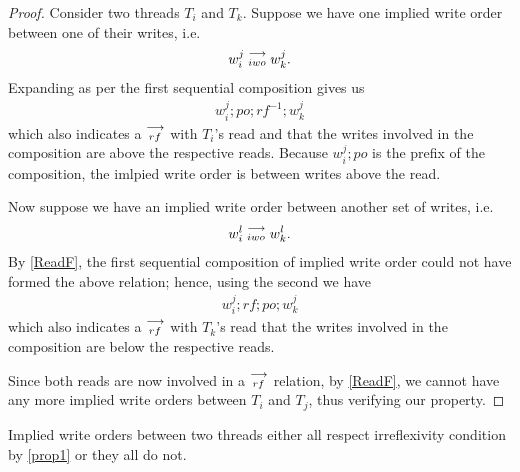     \begin{proof}
        Consider two threads $T_i$ and $T_k$. Suppose we have one implied write order between one of their writes, i.e. 
        \begin{align}
            w_i^j\stackrel{\longrightarrow}{_{iwo}}w_k^j.    
        \end{align}
        Expanding as per the first sequential composition gives us 
        \begin{align}
            w_i^j;po;rf^{-1};w_k^j
        \end{align}
        which also indicates a $\stackrel{\longrightarrow}{_{rf}}$ with $T_i$'s read and that the writes involved in the composition are above the respective reads. Because $w_i^j;po$ is the prefix of the composition, the imlpied write order is between writes above the read. 

        Now suppose we have an implied write order between another set of writes, i.e.
        \begin{align}
            w_i^l\stackrel{\longrightarrow}{_{iwo}}w_k^l.    
        \end{align}
        By \ref{ReadF}, the first sequential composition of implied write order could not have formed the above relation; hence, using the second we have
        \begin{align}
            w_i^j;rf;po;w_k^j 
        \end{align}  
        which also indicates a $\stackrel{\longrightarrow}{_{rf}}$ with $T_k$'s read that the writes involved in the composition are below the respective reads.

        Since both reads are now involved in a $\stackrel{\longrightarrow}{_{rf}}$ relation, by \ref{ReadF}, we cannot have any more implied write orders between $T_i$ and $T_j$, thus verifying our property. 
    \end{proof}
        

    \begin{property}
        \label{prop5}
        Implied write orders between two threads either all respect irreflexivity condition by \ref{prop1} or they all do not.  
    \end{property}

